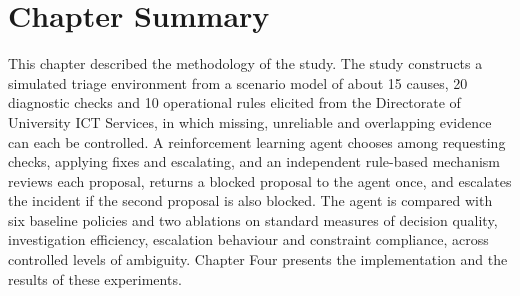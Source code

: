 \section{Chapter Summary}

This chapter described the methodology of the study. The study constructs a simulated triage environment from a scenario model of about 15 causes, 20 diagnostic checks and 10 operational rules elicited from the Directorate of University ICT Services, in which missing, unreliable and overlapping evidence can each be controlled. A reinforcement learning agent chooses among requesting checks, applying fixes and escalating, and an independent rule-based mechanism reviews each proposal, returns a blocked proposal to the agent once, and escalates the incident if the second proposal is also blocked. The agent is compared with six baseline policies and two ablations on standard measures of decision quality, investigation efficiency, escalation behaviour and constraint compliance, across controlled levels of ambiguity. Chapter Four presents the implementation and the results of these experiments.
